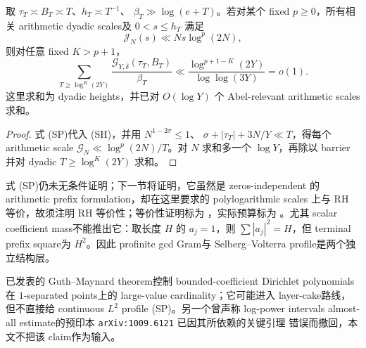 \begin{corollary}
取 $\tau_T\asymp B_T\asymp T$、$h_T\asymp T^{-1}$、
$\beta_T\gg\log(e+T)$。若对某个 fixed $p\geq0$，所有相关 arithmetic dyadic
scales及 $0<s\leq h_T$ 满足
\[
 \mathcal J_N(s)\ll Ns\log^p(2N),               \tag{SP}
\]
则对任意 fixed $K>p+1$，
\[
 \sum_{T\geq\log^K(2Y)}
 \frac{\mathcal G_{Y,\delta}(\tau_T,B_T)}{\beta_T}
 \ll\frac{\log^{p+1-K}(2Y)}{\log\log(3Y)}=o(1). \tag{NE}
\]
这里求和为 dyadic heights，并已对 $O(\log Y)$ 个 Abel-relevant arithmetic
scales求和。
\end{corollary}

\begin{proof}
式 (SP)代入 (SH)，并用 $N^{1-2\sigma}\leq1$、
$\sigma+|\tau_T|+3N/Y\ll T$，得每个 arithmetic scale
$\mathcal G_N\ll\log^p(2N)/T$。对 $N$ 求和多一个 $\log Y$，再除以 barrier
并对 dyadic $T\geq\log^K(2Y)$ 求和。
\end{proof}

式 (SP)仍未无条件证明；下一节将证明，它虽然是 zeros-independent 的
arithmetic prefix formulation，却在这里要求的 polylogarithmic scales 上与 RH
等价，故须注明 RH 等价性；等价性证明标为 \statusT{}，实际预算标为 \statusO{}。尤其 scalar coefficient mass不能推出它：取长度 $H$ 的
$a_j=1$，则 $\sum|a_j|^2=H$，但 terminal prefix square为 $H^2$。因此
profinite gcd Gram与 Selberg--Volterra profile是两个独立结构层。

已发表的 Guth--Maynard theorem控制 bounded-coefficient Dirichlet polynomials在
$1$-separated points上的 large-value cardinality；它可能进入 layer-cake路线，
但不直接给 continuous $L^2$ profile (SP)。另一个曾声称 log-power intervals
almost-all estimate的预印本 \texttt{arXiv:1009.6121} 已因其所依赖的关键引理
错误而撤回，本文不把该 claim作为输入。
